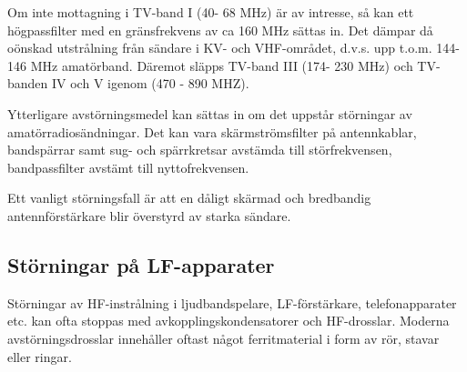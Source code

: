 Om inte mottagning i TV-band I (40- 68 MHz) är av intresse, så kan ett
högpassfilter med en gränsfrekvens av ca 160 MHz sättas in. Det dämpar
då oönskad utstrålning från sändare i KV- och VHF-området, d.v.s. upp
t.o.m. 144-146 MHz amatörband. Däremot släpps TV-band III (174- 230
MHz) och TV-banden IV och V igenom (470 - 890 MHZ).

Ytterligare avstörningsmedel kan sättas in om det uppstår störningar
av amatörradiosändningar. Det kan vara skärmströmsfilter på
antennkablar, bandspärrar samt sug- och spärrkretsar avstämda till
störfrekvensen, bandpassfilter avstämt till nyttofrekvensen.

Ett vanligt störningsfall är att en dåligt skärmad och bredbandig
antennförstärkare blir överstyrd av starka sändare.

\subsection{Störningar på LF-apparater}

Störningar av HF-instrålning i ljudbandspelare, LF-förstärkare,
telefonapparater etc. kan ofta stoppas med avkopplingskondensatorer
och HF-drosslar. Moderna avstörningsdrosslar innehåller oftast något
ferritmaterial i form av rör, stavar eller ringar.
